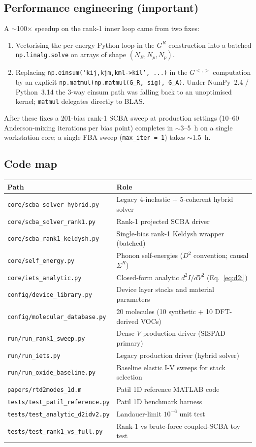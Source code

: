 \documentclass[11pt,a4paper,onecolumn]{article}
\newcommand{\code}[1]{\texttt{\small #1}}
\begin{document}
\subsection{Performance engineering (important)}
A $\sim$100$\times$ speedup on the rank-1 inner loop came from two fixes:
\begin{enumerate}[leftmargin=1.3em,itemsep=0pt]
\item Vectorising the per-energy Python loop in the $G^R$ construction
into a batched \code{np.linalg.solve} on arrays of shape
$(N_E, N_p, N_p)$.
\item Replacing \code{np.einsum('kij,kjm,kml->kil', ...)} in the
$G^{<,>}$ computation by an explicit
\code{np.matmul(np.matmul(G\_R, sig), G\_A)}. Under NumPy~2.4 / Python~3.14
the 3-way einsum path was falling back to an unoptimised kernel;
\code{matmul} delegates directly to BLAS.
\end{enumerate}
After these fixes a 201-bias rank-1 SCBA sweep at production settings
(10--60 Anderson-mixing iterations per bias point) completes in
$\sim$3--5~h on a single workstation core; a single FBA sweep
(\code{max\_iter = 1}) takes $\sim$1.5~h.

\subsection{Code map}
\small
\begin{tabular}{ll}
\toprule
Path & Role\\
\midrule
\code{core/scba\_solver\_hybrid.py}  & Legacy 4-inelastic + 5-coherent hybrid solver\\
\code{core/scba\_solver\_rank1.py}   & Rank-1 projected SCBA driver\\
\code{core/scba\_rank1\_keldysh.py}  & Single-bias rank-1 Keldysh wrapper (batched)\\
\code{core/self\_energy.py}          & Phonon self-energies ($D^2$ convention; causal $\Sigma^R$)\\
\code{core/iets\_analytic.py}        & Closed-form analytic $d^2I/dV^2$ (Eq.~\ref{eq:d2i})\\
\code{config/device\_library.py}     & Device layer stacks and material parameters\\
\code{config/molecular\_database.py} & 20 molecules (10 synthetic + 10 DFT-derived VOCs)\\
\code{run/run\_rank1\_sweep.py}      & Dense-$V$ production driver (SISPAD primary)\\
\code{run/run\_iets.py}              & Legacy production driver (hybrid solver)\\
\code{run/run\_oxide\_baseline.py}   & Baseline elastic I-V sweeps for stack selection\\
\code{papers/rtd2modes\_1d.m}        & Patil 1D reference MATLAB code\\
\code{tests/test\_patil\_reference.py} & Patil 1D benchmark harness\\
\code{tests/test\_analytic\_d2idv2.py} & Landauer-limit $10^{-6}$ unit test\\
\code{tests/test\_rank1\_vs\_full.py}  & Rank-1 vs brute-force coupled-SCBA toy test\\
\bottomrule
\end{tabular}
\end{document}
